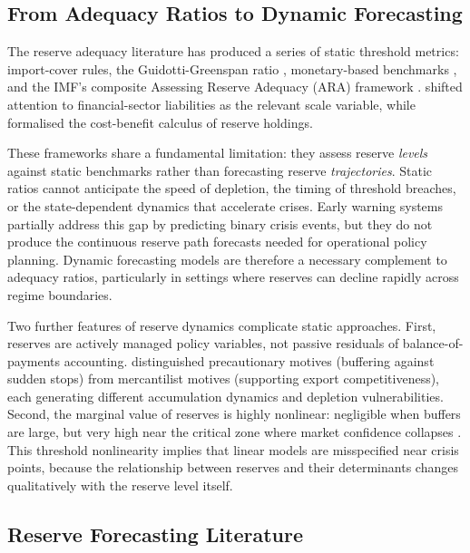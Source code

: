 \documentclass[12pt,a4paper]{article}
\begin{document}
\subsection{From Adequacy Ratios to Dynamic Forecasting}

The reserve adequacy literature has produced a series of static threshold metrics: import-cover rules, the Guidotti-Greenspan ratio \citep{Greenspan1999}, monetary-based benchmarks \citep{Calvo1996,Wijnholds2001}, and the IMF's composite Assessing Reserve Adequacy (ARA) framework \citep{IMF2011,IMF2015}. \cite{Obstfeld2010} shifted attention to financial-sector liabilities as the relevant scale variable, while \cite{JeanneRanciere2011} formalised the cost-benefit calculus of reserve holdings.

These frameworks share a fundamental limitation: they assess reserve \textit{levels} against static benchmarks rather than forecasting reserve \textit{trajectories}. Static ratios cannot anticipate the speed of depletion, the timing of threshold breaches, or the state-dependent dynamics that accelerate crises. Early warning systems \citep{KaminskyLizondoReinhart1998,FrankelSaravelos2012} partially address this gap by predicting binary crisis events, but they do not produce the continuous reserve path forecasts needed for operational policy planning. Dynamic forecasting models are therefore a necessary complement to adequacy ratios, particularly in settings where reserves can decline rapidly across regime boundaries.

Two further features of reserve dynamics complicate static approaches. First, reserves are actively managed policy variables, not passive residuals of balance-of-payments accounting. \cite{AizenmanLee2007} distinguished precautionary motives (buffering against sudden stops) from mercantilist motives (supporting export competitiveness), each generating different accumulation dynamics and depletion vulnerabilities. Second, the marginal value of reserves is highly nonlinear: negligible when buffers are large, but very high near the critical zone where market confidence collapses \citep{JeanneRanciere2011}. This threshold nonlinearity implies that linear models are misspecified near crisis points, because the relationship between reserves and their determinants changes qualitatively with the reserve level itself.

\subsection{Reserve Forecasting Literature}
\end{document}
